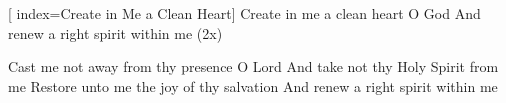 [
index={Create in Me a Clean Heart}]
\beginverse	
Create in me a clean heart O God
And renew a right spirit within me (2x)
\endverse

\beginchorus
Cast me not away from thy presence O Lord
And take not thy Holy Spirit from me
Restore unto me the joy of thy salvation
And renew a right spirit within me
\endchorus


\endsong